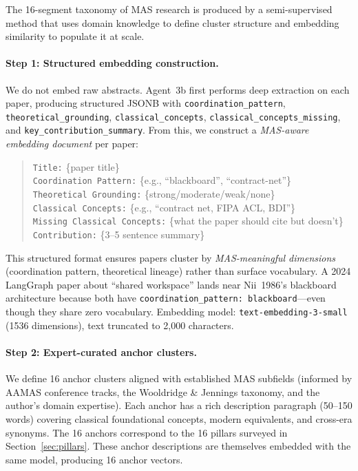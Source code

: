 \documentclass{article}
\begin{document}
The 16-segment taxonomy of MAS research is produced by a semi-supervised method that
uses domain knowledge to define cluster structure and embedding similarity to populate
it at scale.

\paragraph{Step 1: Structured embedding construction.}
We do not embed raw abstracts. Agent~3b first performs deep extraction on each paper,
producing structured JSONB with \texttt{coordination\_pattern},
\texttt{theoretical\_grounding}, \texttt{classical\_concepts},
\texttt{classical\_concepts\_missing}, and \texttt{key\_contribution\_summary}. From
this, we construct a \emph{MAS-aware embedding document} per paper:

\begin{quote}\small
\texttt{Title:} \{paper title\} \\
\texttt{Coordination Pattern:} \{e.g., ``blackboard'', ``contract-net''\} \\
\texttt{Theoretical Grounding:} \{strong/moderate/weak/none\} \\
\texttt{Classical Concepts:} \{e.g., ``contract net, FIPA ACL, BDI''\} \\
\texttt{Missing Classical Concepts:} \{what the paper should cite but doesn't\} \\
\texttt{Contribution:} \{3--5 sentence summary\}
\end{quote}

\noindent
This structured format ensures papers cluster by \emph{MAS-meaningful dimensions}
(coordination pattern, theoretical lineage) rather than surface vocabulary. A 2024
LangGraph paper about ``shared workspace'' lands near Nii~1986's blackboard architecture
because both have \texttt{coordination\_pattern: blackboard}---even though they share
zero vocabulary. Embedding model: \texttt{text-embedding-3-small} (1536 dimensions),
text truncated to 2,000 characters.

\paragraph{Step 2: Expert-curated anchor clusters.}
We define 16 anchor clusters aligned with established MAS subfields (informed by
AAMAS conference tracks, the Wooldridge \& Jennings taxonomy, and the author's domain
expertise). Each anchor has a rich description paragraph (50--150 words) covering
classical foundational concepts, modern equivalents, and cross-era synonyms. The 16
anchors correspond to the 16 pillars surveyed in Section~\ref{sec:pillars}. These
anchor descriptions are themselves embedded with the same model, producing 16 anchor
vectors.
\end{document}
